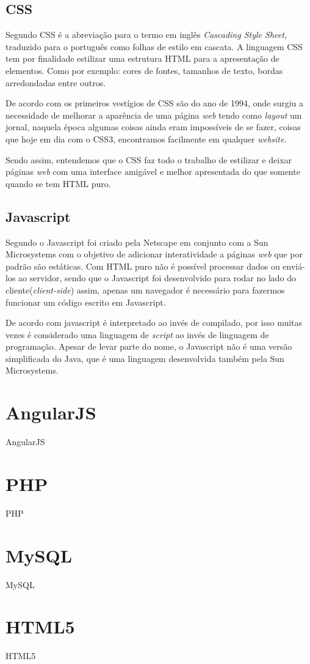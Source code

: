 	\subsection{CSS}
		\par Segundo  CSS é a abreviação para o termo em inglês \textit{Cascading Style Sheet}, traduzido para o
		português como folhas de estilo em cascata. A linguagem CSS tem por finalidade estilizar uma estrutura HTML para a apresentação de elementos. Como por exemplo: cores de fontes, tamanhos de texto, bordas arredondadas entre outros.
		\par De acordo com  os primeiros vestígios de CSS são do ano de 1994, onde surgiu a necessidade de melhorar a aparência de uma página \textit{web} tendo como \textit{layout} um jornal, naquela época algumas coisas ainda eram impossíveis de se fazer, coisas que hoje em dia com o CSS3, encontramos facilmente em qualquer \textit{website}.
		\par Sendo assim, entendemos que o CSS faz todo o trabalho de estilizar e deixar páginas \textit{web} com uma interface amigável e melhor apresentada do que somente quando se tem HTML puro.
		
	\subsection{Javascript}
		\par Segundo  o Javascript foi criado pela Netscape em conjunto com a Sun Microsystems com o objetivo de adicionar interatividade a páginas \textit{web} que por padrão são estáticas. Com HTML puro não é possível processar dados ou enviá-los ao servidor, sendo que o Javascript foi desenvolvido para rodar no lado do cliente(\textit{client-side}) assim, apenas um navegador é necessário para fazermos funcionar um código escrito em Javascript.
		\par De acordo com  javascript é interpretado ao invés de compilado, por isso muitas vezes é considerado uma linguagem de \textit{script} ao invés de linguagem de programação. Apesar de levar parte do nome, o Javascript não é uma versão simplificada do Java, que é uma linguagem desenvolvida também pela Sun Microsystems.
		
\section{AngularJS}
	\par AngularJS

\section{PHP}
	\par PHP

\section{MySQL}
	\par MySQL

\section{HTML5}
	\par HTML5